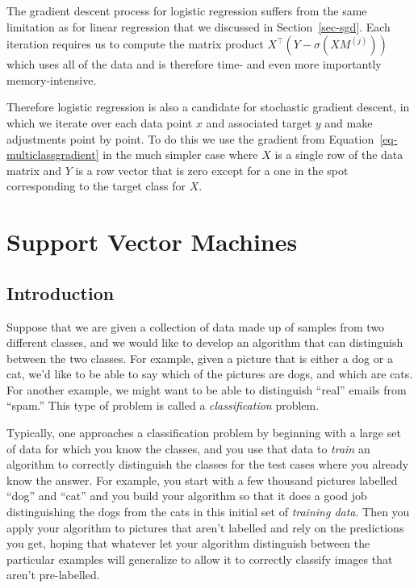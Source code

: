 \documentclass[
  11pt,
  letterpaper,
]{scrbook}
\theoremstyle{plain}
\theoremstyle{remark}
\begin{document}
The gradient descent process for logistic regression suffers from the
same limitation as for linear regression that we discussed in
Section~\ref{sec-sgd}. Each iteration requires us to compute the matrix
product \(X^{\intercal}(Y-\sigma(XM^{(j)}))\) which uses all of the data
and is therefore time- and even more importantly memory-intensive.

Therefore logistic regression is also a candidate for stochastic
gradient descent, in which we iterate over each data point \(x\) and
associated target \(y\) and make adjustments point by point. To do this
we use the gradient from Equation~\ref{eq-multiclassgradient} in the
much simpler case where \(X\) is a single row of the data matrix and
\(Y\) is a row vector that is zero except for a one in the spot
corresponding to the target class for \(X\).


\hypertarget{support-vector-machines}{%
\chapter{Support Vector Machines}\label{support-vector-machines}}

\hypertarget{introduction-4}{%
\section{Introduction}\label{introduction-4}}

Suppose that we are given a collection of data made up of samples from
two different classes, and we would like to develop an algorithm that
can distinguish between the two classes. For example, given a picture
that is either a dog or a cat, we'd like to be able to say which of the
pictures are dogs, and which are cats. For another example, we might
want to be able to distinguish ``real'' emails from ``spam.'' This type
of problem is called a \emph{classification} problem.

Typically, one approaches a classification problem by beginning with a
large set of data for which you know the classes, and you use that data
to \emph{train} an algorithm to correctly distinguish the classes for
the test cases where you already know the answer. For example, you start
with a few thousand pictures labelled ``dog'' and ``cat'' and you build
your algorithm so that it does a good job distinguishing the dogs from
the cats in this initial set of \emph{training data}. Then you apply
your algorithm to pictures that aren't labelled and rely on the
predictions you get, hoping that whatever let your algorithm distinguish
between the particular examples will generalize to allow it to correctly
classify images that aren't pre-labelled.
\end{document}
